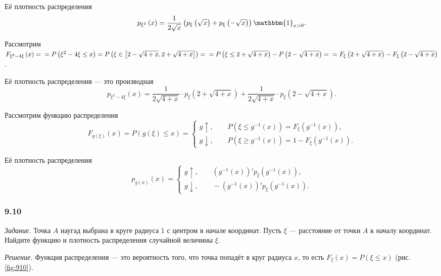 Её плотность распределения
$$p_{ \xi^2} \left( x \right) =
\frac{1}{2 \sqrt{x}} \left( p_{ \xi } \left( \sqrt{x} \right) + p_{ \xi } \left( - \sqrt{x} \right) \right) \mathbbm{1}_{x > 0}.$$

Рассмотрим $F_{ \xi^2 - 4 \xi } \left( x \right) = \\
= P \left( \xi^2 - 4 \xi \leq x \right) =
P \left( \xi \in \left[ 2 - \sqrt{4+x}, 2 + \sqrt{4+x} \right] \right) = \\
= P \left( \xi \leq 2 + \sqrt{4+x} \right) - P \left( 2 - \sqrt{4+x} \right) = \\
= F_{ \xi } \left( 2 + \sqrt{4+x} \right) - F_{ \xi } \left( 2 - \sqrt{4+x} \right) $.

Её плотность распределения --- это производная
$$p_{ \xi^2 - 4 \xi} \left( x \right) =
\frac{1}{2 \sqrt{4+x}} \cdot p_{ \xi } \left( 2 + \sqrt{4+x} \right) + \frac{1}{2 \sqrt{4+x}} \cdot p_{ \xi } \left( 2 - \sqrt{4+x} \right).$$

Рассмотрим функцию распределения
$$F_{g \left( \xi \right) } \left( x \right) =
P \left( g \left( \xi \right) \leq x \right) =
\begin{cases}
g \uparrow, \qquad P \left( \xi \leq g^{-1} \left( x \right) \right) = F_{ \xi } \left( g^{-1} \left( x \right) \right), \\
g \downarrow, \qquad P \left( \xi \geq g^{-1} \left( x \right) \right) = 1 - F_{ \xi } \left( g^{-1} \left( x \right) \right).
\end{cases}$$

Её плотность распределения
$$p_{g \left( x \right) } \left( x \right) =
\begin{cases}
g \uparrow, \qquad \left( g^{-1} \left( x \right) \right)'p_{ \xi } \left( g^{-1} \left( x \right) \right), \\
g \downarrow, \qquad -\left( g^{-1} \left( x \right) \right)'p_{ \xi } \left( g^{-1} \left( x \right) \right).
\end{cases}$$

\subsubsection*{9.10}

\textit{Задание.} Точка $A$ наугад выбрана в круге радиуса 1 с центром в начале координат.
Пусть $ \xi $ --- расстояние от точки $A$ к началу координат.
Найдите функцию и плотность распределения случайной величины $ \xi $.

\textit{Решение.}
Функция распределения --- это вероятность того,
что точка попадёт в круг радиуса $x$, то есть $F_{ \xi } \left( x \right) = P \left( \xi \leq x \right) $ (рис. \ref{fig:910}).

